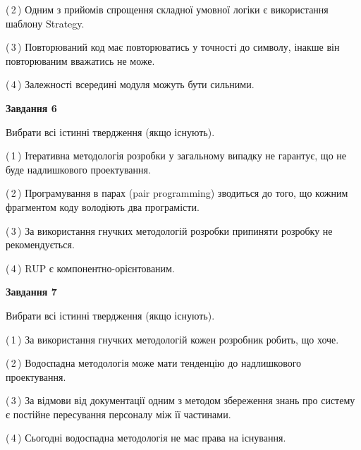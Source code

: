 \documentclass[10pt, ukrainian]{article}
\begin{document}
{\begin {large}
(\,2\,) Одним з прийомів спрощення складної умовної логіки є використання шаблону Strategy. %



(\,3\,) Повторюваний код має повторюватись у точності до символу, інакше він повторюваним вважатись не може. %



(\,4\,) Залежності всередині модуля можуть бути сильними. %

\newpage

{\begin {center}\textbf{Завдання 6}\end {center}}\par
Вибрати всі істинні твердження (якщо існують).\par
\vspace{2mm}



(\,1\,) Ітеративна методологія розробки у загальному випадку не гарантує, що не буде надлишкового проектування. %



(\,2\,) Програмування в парах (pair programming) зводиться до того, що кожним фрагментом коду володіють два програмісти. %



(\,3\,) За використання гнучких методологій розробки припиняти розробку не рекомендується. %



(\,4\,) RUP є компонентно-орієнтованим. %


{\begin {center}\textbf{Завдання 7}\end {center}}\par
Вибрати всі істинні твердження (якщо існують).\par
\vspace{2mm}



(\,1\,) За використання гнучких методологій кожен розробник робить, що хоче. %



(\,2\,) Водоспадна методологія може мати тенденцію до надлишкового проектування. %



(\,3\,) За відмови від документації одним з методом збереження знань про систему є постійне пересування персоналу між її частинами. %



(\,4\,) Сьогодні водоспадна методологія не має права на існування. %



\end{large}}
\end{document}
